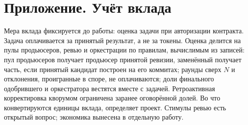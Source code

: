 \documentclass[11pt,a4paper]{article}
\begin{document}
\section*{Приложение. Учёт вклада}

Мера вклада фиксируется до работы: оценка задачи при авторизации контракта. Задача оплачивается за принятый результат, а не за токены. Оценка делится на пулы продьюсеров, ревью и оркестрации по правилам, вычислимым из записей: пул продьюсеров получает продьюсер принятой ревизии, заменённый получает часть, если принятый кандидат построен на его коммитах; раунды сверх $N$ и отклонения, проигранные в споре, не оплачиваются; доли финального одобрившего и оркестратора вестятся вместе с задачей. Ретроактивная корректировка кворумом ограничена заранее оговорённой долей. Во что конвертируются единицы вклада, определяет проект. Стимулы ревью есть открытый вопрос; экономика вынесена в отдельную работу.
\end{document}
